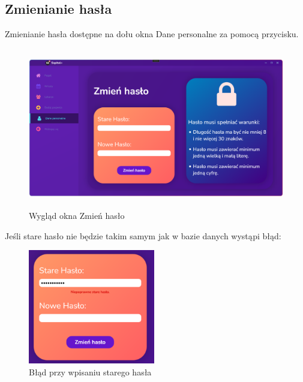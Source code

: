 \begin{flushleft}
    \subsection{\Large{Zmienianie hasła}}
    \hspace{5mm}Zmienianie hasła dostępne na dołu okna Dane personalne za pomocą przycisku.
    \begin{figure}[H]
        \begin{center}
	\includegraphics[height=7cm]{images/zmien_hasl.png}
        \caption{Wygląd okna \textquotedbl Zmień hasło\textquotedbl{}}
        \label{fig:zmien_hasl}
	\end{center}
    \end{figure}
    \hspace{5mm}Jeśli stare hasło nie będzie takim samym jak w bazie danych wystąpi błąd:
    \begin{figure}[H]
        \begin{center}
	\includegraphics[height=5cm]{images/niepop_stare_hasl.png}
        \caption{Błąd przy wpisaniu starego hasła}
        \label{fig:niepop_st_haslo}
	\end{center}
    \end{figure}
    \newpage

\end{flushleft}
